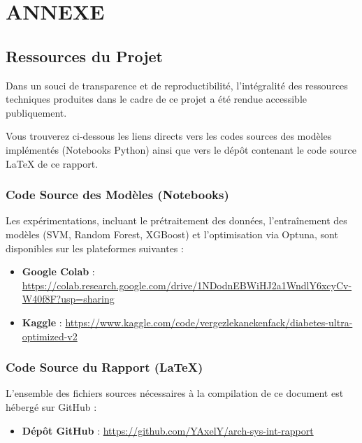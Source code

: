 \newpage
\chapter*{ANNEXE}

\section*{Ressources du Projet}

Dans un souci de transparence et de reproductibilité, l'intégralité des ressources techniques produites dans le cadre de ce projet a été rendue accessible publiquement.

Vous trouverez ci-dessous les liens directs vers les codes sources des modèles implémentés (Notebooks Python) ainsi que vers le dépôt contenant le code source LaTeX de ce rapport.

\subsection*{Code Source des Modèles (Notebooks)}
Les expérimentations, incluant le prétraitement des données, l'entraînement des modèles (SVM, Random Forest, XGBoost) et l'optimisation via Optuna, sont disponibles sur les plateformes suivantes :
\begin{itemize}
    \item \textbf{Google Colab} : \url{https://colab.research.google.com/drive/1NDodnEBWiHJ2a1WndlY6xcyCv-W40f8F?usp=sharing} %
    \item \textbf{Kaggle} : \url{https://www.kaggle.com/code/vergezlekanekenfack/diabetes-ultra-optimized-v2}
\end{itemize}

\subsection*{Code Source du Rapport (LaTeX)}
L'ensemble des fichiers sources nécessaires à la compilation de ce document est hébergé sur GitHub :
\begin{itemize}
    \item \textbf{Dépôt GitHub} : \url{https://github.com/YAxelY/arch-sys-int-rapport}
\end{itemize}